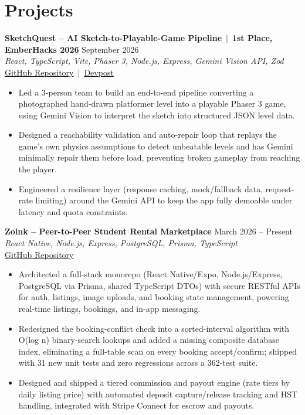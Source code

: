 \documentclass[10pt,letterpaper]{article}
\begin{document}
\section*{Projects}
\textbf{SketchQuest -- AI Sketch-to-Playable-Game Pipeline} \,$|$\, \textbf{1st Place, EmberHacks 2026} \hfill September 2026\\
\textit{React, TypeScript, Vite, Phaser 3, Node.js, Express, Gemini Vision API, Zod}\\
\href{https://github.com/VanshParikh1/SketchQuest}{GitHub Repository} \,$|$\, \href{https://devpost.com/software/sketchquest}{Devpost}
\begin{itemize}
    \item Led a 3-person team to build an end-to-end pipeline converting a photographed hand-drawn platformer level into a playable Phaser 3 game, using Gemini Vision to interpret the sketch into structured JSON level data.
    \item Designed a reachability validation and auto-repair loop that replays the game's own physics assumptions to detect unbeatable levels and has Gemini minimally repair them before load, preventing broken gameplay from reaching the player.
    \item Engineered a resilience layer (response caching, mock/fallback data, request-rate limiting) around the Gemini API to keep the app fully demoable under latency and quota constraints.
\end{itemize}
\textbf{Zoink -- Peer-to-Peer Student Rental Marketplace} \hfill March 2026 -- Present\\
\textit{React Native, Node.js, Express, PostgreSQL, Prisma, TypeScript}\\
\href{https://github.com/VanshParikh1/Zoink}{GitHub Repository}
\begin{itemize}
    \item Architected a full-stack monorepo (React Native/Expo, Node.js/Express, PostgreSQL via Prisma, shared TypeScript DTOs) with secure RESTful APIs for auth, listings, image uploads, and booking state management, powering real-time listings, bookings, and in-app messaging.
    \item Redesigned the booking-conflict check into a sorted-interval algorithm with O(log n) binary-search lookups and added a missing composite database index, eliminating a full-table scan on every booking accept/confirm; shipped with 31 new unit tests and zero regressions across a 362-test suite.
    \item Designed and shipped a tiered commission and payout engine (rate tiers by daily listing price) with automated deposit capture/release tracking and HST handling, integrated with Stripe Connect for escrow and payouts.
\end{itemize}
\end{document}
